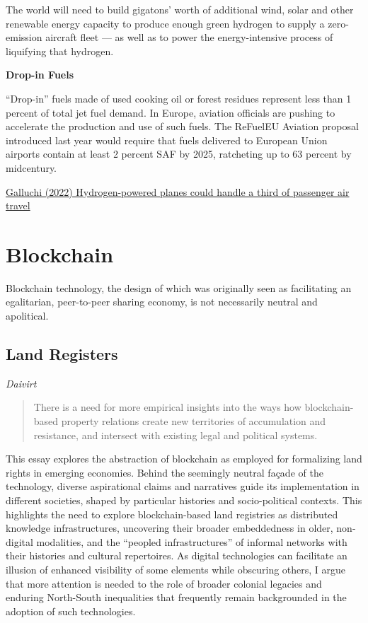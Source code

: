 \documentclass[
]{book}
\begin{document}
The world will need to build gigatons' worth of additional wind, solar and other renewable energy capacity to produce enough green hydrogen to supply a zero-emission aircraft fleet --- as well as to power the energy-intensive process of liquifying that hydrogen.

\textbf{Drop-in Fuels}

``Drop-in'' fuels made of used cooking oil or forest residues represent less than 1 percent of total jet fuel demand. In Europe, aviation officials are pushing to accelerate the production and use of such fuels. The ReFuelEU Aviation proposal introduced last year would require that fuels delivered to European Union airports contain at least 2 percent SAF by 2025, ratcheting up to 63 percent by midcentury.

\href{https://www.canarymedia.com/articles/air-travel/hydrogen-powered-planes-could-handle-a-third-of-passenger-air-travel-study-finds}{Galluchi (2022) Hydrogen-powered planes could handle a third of passenger air travel}

\hypertarget{blockchain}{%
\chapter{Blockchain}\label{blockchain}}

Blockchain technology, the design of which was originally seen as facilitating an egalitarian, peer-to-peer sharing economy, is not necessarily neutral and apolitical.

\hypertarget{land-registers}{%
\section{Land Registers}\label{land-registers}}

\emph{Daivirt}

\begin{quote}
There is a need for more empirical insights into the ways how blockchain-based property relations create new territories of accumulation and resistance, and intersect with existing legal and political systems.
\end{quote}

This essay explores the abstraction of blockchain as employed for formalizing land rights in emerging economies. Behind the seemingly neutral façade of the technology, diverse aspirational claims and narratives guide its implementation in different societies, shaped by particular histories and socio-political contexts. This highlights the need to explore blockchain-based land registries as distributed knowledge infrastructures, uncovering their broader embeddedness in older, non-digital modalities, and the ``peopled infrastructures'' of informal networks with their histories and cultural repertoires. As digital technologies can facilitate an illusion of enhanced visibility of some elements while obscuring others, I argue that more attention is needed to the role of broader colonial legacies and enduring North-South inequalities that frequently remain backgrounded in the adoption of such technologies.
\end{document}
